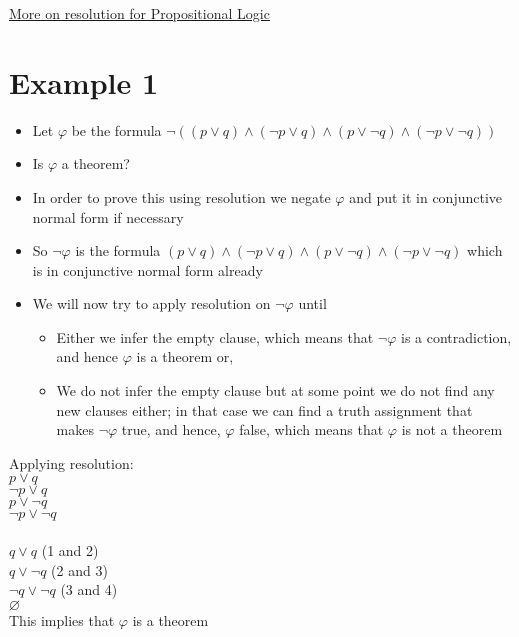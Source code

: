 \documentclass{article}[18pt]
\begin{document}
\begin{center}
\underline{\huge More on resolution for Propositional Logic}
\end{center}
\section{Example 1}
\begin{itemize}
	\item Let $\varphi$ be the formula $\neg ( ( p \lor q ) \land ( \neg p \lor q ) \land ( p \lor \neg q ) \land ( \neg p \lor \neg q ) )$
	\item Is $\varphi$ a theorem?
	\item In order to prove this using resolution we negate $\varphi$ and put it in conjunctive normal form if necessary
	\item So $\lnot \varphi$ is the formula $( p \lor q ) \land ( \neg p \lor q ) \land ( p \lor \neg q ) \land ( \neg p \lor \neg q )$ which is in conjunctive normal form already
	\item We will now try to apply resolution on $\lnot\varphi$ until
	\begin{itemize}
		\item Either we infer the empty clause, which means that $\lnot \varphi$ is a contradiction, and hence $\varphi$ is a theorem or,
		\item We do not infer the empty clause but at some point we do not find any new clauses either; in that case we can find a truth assignment that makes $\lnot\varphi$ true, and hence, $\varphi$ false, which means that $\varphi$ is not a theorem
	\end{itemize}
\end{itemize}
Applying resolution:\\
$p\lor q$\\
$\lnot p \lor q$\\
$p\lor \lnot q$\\
$\lnot p\lor \lnot q$\\
\\
$q\lor q$ (1 and 2)\\
$q\lor \lnot q$ (2 and 3)\\
$\lnot q \lor \lnot q$ (3 and 4)\\
$\varnothing$\\
This implies that $\varphi$ is a theorem
\end{document}
